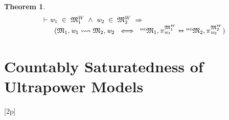\documentclass{llncs}
\newtheorem{thm}{Theorem}[chapter]
\newenvironment{holmath}{\begin{displaymath}\begin{array}{l}}{\end{array}\end{displaymath}\ignorespacesafterend}
\begin{document}
\begin{thm}
{\upshape\cite[Proposition 2.62]{Blackburn}}
\begin{holmath}
  \ensuremath{\HOLTokenTurnstile}\HOLFreeVar{w}\sb{\mathrm{1}}\;\HOLSymConst{\HOLTokenIn{}}\;\HOLFreeVar{\ensuremath{\mathfrak{M}}}\sb{\mathrm{1}}\HOLSymConst{\ensuremath{\sp{W}}}\;\HOLSymConst{\HOLTokenConj{}}\;\HOLFreeVar{w}\sb{\mathrm{2}}\;\HOLSymConst{\HOLTokenIn{}}\;\HOLFreeVar{\ensuremath{\mathfrak{M}}}\sb{\mathrm{2}}\HOLSymConst{\ensuremath{\sp{W}}}\;\HOLSymConst{\HOLTokenImp{}}\\
\;\;\;\;\;\;\;(\HOLFreeVar{\ensuremath{\mathfrak{M}}}\sb{\mathrm{1}},\HOLFreeVar{w}\sb{\mathrm{1}}\ensuremath{\leftrightsquigarrow}\HOLFreeVar{\ensuremath{\mathfrak{M}}}\sb{\mathrm{2}},\HOLFreeVar{w}\sb{\mathrm{2}}\;\HOLSymConst{\HOLTokenEquiv{}}\;{}\sp{ue}{\HOLFreeVar{\ensuremath{\mathfrak{M}}}\sb{\mathrm{1}}}\HOLSymConst{,}\pi\sb{\HOLFreeVar{w}\sb{\mathrm{1}}}\sp{\HOLFreeVar{\ensuremath{\mathfrak{M}}}\sb{\mathrm{1}}\HOLSymConst{\ensuremath{\sp{W}}}}\HOLSymConst{\ensuremath{\leftrightarroweq}}{}\sp{ue}{\HOLFreeVar{\ensuremath{\mathfrak{M}}}\sb{\mathrm{2}}}\HOLSymConst{,}\pi\sb{\HOLFreeVar{w}\sb{\mathrm{2}}}\sp{\HOLFreeVar{\ensuremath{\mathfrak{M}}}\sb{\mathrm{2}}\HOLSymConst{\ensuremath{\sp{W}}}})
\end{holmath}
\end{thm}

\section{Countably Saturatedness of Ultrapower Models}[2p]
\end{document}
